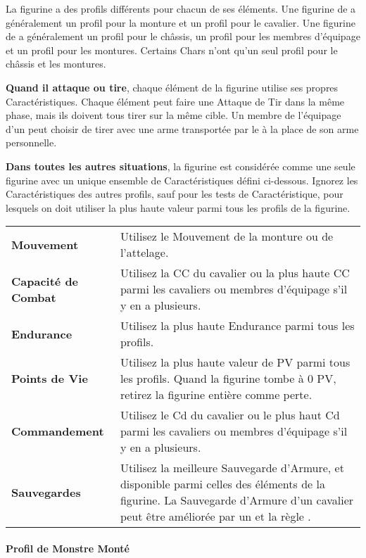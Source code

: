 La figurine a des profils différents pour chacun de ses éléments. Une figurine de \cavalry{} a généralement un profil pour la monture et un profil pour le cavalier. Une figurine de \chariot{} a généralement un profil pour le châssis, un profil pour les membres d'équipage et un profil pour les montures. Certains Chars n'ont qu'un seul profil pour le châssis et les montures.

\textbf{Quand il attaque ou tire}, chaque élément de la figurine utilise ses propres Caractéristiques. Chaque élément peut faire une Attaque de Tir dans la même phase, mais ils doivent tous tirer sur la même cible. Un membre de l'équipage d'un \chariot{} peut choisir de tirer avec une arme transportée par le \chariot{} à la place de son arme personnelle.

\textbf{Dans toutes les autres situations}, la figurine est considérée comme une seule figurine avec un unique ensemble de Caractéristiques défini ci-dessous. Ignorez les Caractéristiques des autres profils, sauf pour les tests de Caractéristique, pour lesquels on doit utiliser la plus haute valeur parmi tous les profils de la figurine.

\vspace*{10pt}
\renewcommand{\arraystretch}{2.5}
\begin{center}
\begin{tabular}{>{\bfseries\raggedleft}p{3cm}p{12cm}}
\hline
Mouvement & Utilisez le Mouvement de la monture ou de l'attelage. \tabularnewline
Capacité de Combat & Utilisez la CC du cavalier ou la plus haute CC parmi les cavaliers ou membres d'équipage s'il y en a plusieurs. \tabularnewline
Endurance & Utilisez la plus haute Endurance parmi tous les profils. \tabularnewline
Points de Vie & Utilisez la plus haute valeur de PV parmi tous les profils. Quand la figurine tombe à 0 PV, retirez la figurine entière comme perte. \tabularnewline
Commandement & Utilisez le Cd du cavalier ou le plus haut Cd parmi les cavaliers ou membres d'équipage s'il y en a plusieurs. \tabularnewline
Sauvegardes & Utilisez la meilleure Sauvegarde d'Armure, \regeneration{} et \wardsave{} disponible parmi celles des éléments de la figurine. La Sauvegarde d'Armure d'un cavalier peut être améliorée par un \barding{} et la règle \mountsprotection{}. \tabularnewline
\hline
\end{tabular}\end{center}
\renewcommand{\arraystretch}{1.5}

\newpage
\paragraph{Profil de Monstre Monté}
\label{ridden_monster_profile}


